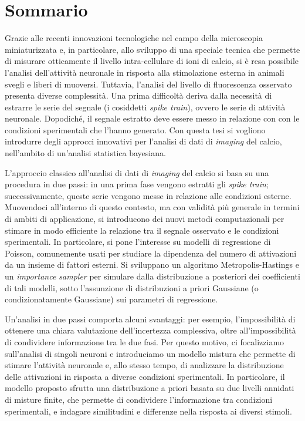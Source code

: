 \chapter*{Sommario} 
Grazie alle recenti innovazioni tecnologiche nel campo della microscopia miniaturizzata e, in particolare, allo sviluppo di una speciale tecnica che permette di misurare otticamente il livello intra-cellulare di ioni di calcio, si è resa possibile l'analisi dell'attività neuronale in risposta alla stimolazione esterna in animali svegli e liberi di muoversi.
Tuttavia, l'analisi del livello di fluorescenza osservato presenta diverse complessità. Una prima difficoltà deriva dalla necessità di estrarre le serie del segnale (i cosiddetti \textit{spike train}), ovvero le serie di attività neuronale. Dopodiché, il segnale estratto deve essere messo in relazione con con le condizioni sperimentali che l'hanno generato. Con questa tesi si vogliono introdurre degli approcci innovativi per l'analisi di dati di \textit{imaging} del calcio, nell'ambito di un'analisi statistica bayesiana.

L'approccio classico all'analisi di dati di \textit{imaging} del calcio si basa su una procedura in due passi: in una prima fase vengono estratti gli \textit{spike train}; successivamente, queste serie vengono messe in relazione alle condizioni esterne. Muovendoci all'interno di questo contesto, ma con validità più generale in termini di ambiti di applicazione, si introducono dei nuovi metodi computazionali per stimare in modo efficiente la relazione tra il segnale osservato e le condizioni sperimentali. In particolare, si pone l'interesse su modelli di regressione di Poisson, comunemente usati per studiare la dipendenza del numero di attivazioni da un insieme di fattori esterni. Si sviluppano un algoritmo Metropolis-Hastings e un \textit{importance sampler} per simulare dalla distribuzione a posteriori dei coefficienti di tali modelli, sotto l'assunzione di distribuzioni a priori Gaussiane (o condizionatamente Gaussiane) sui parametri di regressione.

Un'analisi in due passi comporta alcuni svantaggi: per esempio, l'impossibilità di ottenere una chiara valutazione dell'incertezza complessiva, oltre all'impossibilità di condividere informazione tra le due fasi. Per questo motivo, ci focalizziamo sull'analisi di singoli neuroni e introduciamo un modello mistura che permette di stimare l'attività neuronale e, allo stesso tempo, di analizzare la distribuzione delle attivazioni in risposta a diverse condizioni sperimentali. In particolare, il modello proposto sfrutta una distribuzione a priori basata su due livelli annidati di misture finite, che permette di condividere l'informazione tra condizioni sperimentali, e indagare similitudini e differenze nella risposta ai diversi stimoli.


